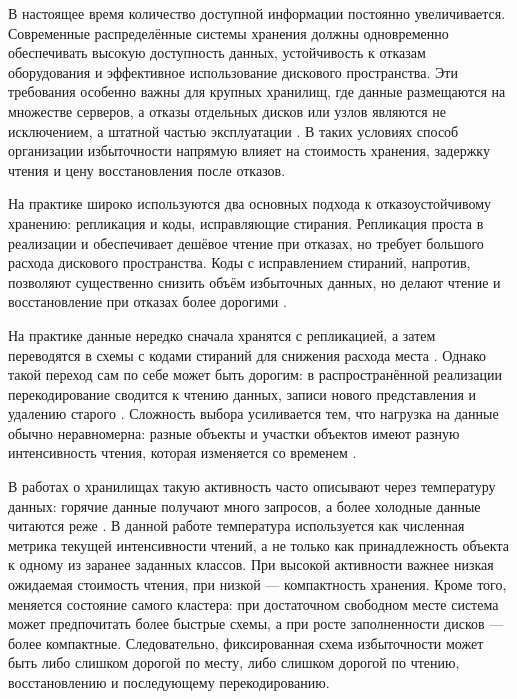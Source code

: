 
В настоящее время количество доступной информации постоянно увеличивается.
Современные распределённые системы хранения должны одновременно обеспечивать
высокую доступность данных, устойчивость к отказам оборудования и эффективное
использование дискового пространства. Эти требования особенно важны для
крупных хранилищ, где данные размещаются на множестве серверов, а отказы
отдельных дисков или узлов являются не исключением, а штатной частью
эксплуатации \cite{shen2024erasurecoding}. В таких условиях способ
организации избыточности напрямую влияет на стоимость хранения, задержку
чтения и цену восстановления после отказов.

На практике широко используются два основных подхода к отказоустойчивому
хранению: репликация и коды, исправляющие стирания. Репликация проста в
реализации и обеспечивает дешёвое чтение при отказах, но требует большого
расхода дискового пространства. Коды с исправлением стираний, напротив,
позволяют существенно снизить объём избыточных данных, но делают чтение и
восстановление при отказах более дорогими
\cite{huang2012azure,muralidhar2014f4}.

На практике данные нередко сначала хранятся с репликацией, а затем переводятся
в схемы с кодами стираний для снижения расхода места
\cite{li2017ear,kim2024morph}. Однако такой переход сам по себе может быть
дорогим: в распространённой реализации перекодирование сводится к чтению
данных, записи нового представления и удалению старого \cite{kim2024morph}.
Сложность выбора усиливается тем, что нагрузка на данные обычно неравномерна:
разные объекты и участки объектов имеют разную интенсивность чтения, которая
изменяется со временем \cite{levandoski2013hotcold,muralidhar2014f4}.

В работах о хранилищах такую активность часто описывают через температуру
данных: горячие данные получают много запросов, а более холодные данные
читаются реже \cite{muralidhar2014f4,song2024hsm}. В данной работе температура
используется как численная метрика текущей интенсивности чтений, а не только
как принадлежность объекта к одному из заранее заданных классов. При высокой
активности важнее низкая ожидаемая стоимость чтения, при низкой ---
компактность хранения. Кроме того, меняется состояние самого кластера: при
достаточном свободном месте система может предпочитать более быстрые схемы, а
при росте заполненности дисков --- более компактные. Следовательно,
фиксированная схема избыточности может быть либо слишком дорогой по месту, либо
слишком дорогой по чтению, восстановлению и последующему перекодированию.

